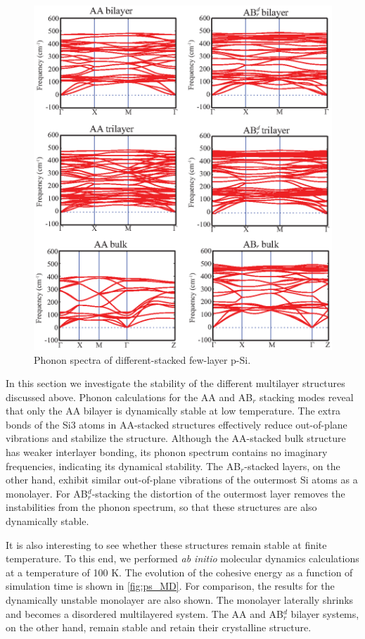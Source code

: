 \begin{figure}[htb]
\centering
\includegraphics[width=0.9\linewidth]{ps_phonon_spectrum.eps}%
\caption{Phonon spectra of different-stacked few-layer p-Si. \label{fig:ps_phonon}}
\end{figure}

In this section we investigate the stability of the different multilayer structures discussed above.
Phonon calculations for the AA and AB$_r$ stacking modes reveal that only the AA bilayer is dynamically stable at low temperature. The extra bonds of the Si3 atoms in AA-stacked structures effectively reduce out-of-plane vibrations and stabilize the structure. Although the AA-stacked bulk structure has weaker interlayer bonding, its phonon spectrum contains no imaginary frequencies, indicating its dynamical stability. The AB$_r$-stacked layers, on the other hand, exhibit similar out-of-plane vibrations of the outermost Si atoms as a monolayer. For AB$_r^d$-stacking the distortion of the outermost layer removes the instabilities from the phonon spectrum, so that these structures are also dynamically stable. 

It is also interesting to see whether these structures remain stable at finite temperature. To this end, we performed \textit{ab initio} molecular dynamics calculations at a temperature of 100 K. The evolution of the cohesive energy as a function of simulation time is shown in \autoref{fig:ps_MD}. For comparison, the results for the dynamically unstable monolayer are also shown. The monolayer laterally shrinks and becomes a disordered multilayered system. The AA and AB$_r^d$ bilayer systems, on the other hand, remain stable and retain their crystalline structure.


